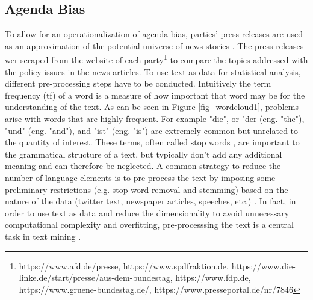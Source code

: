 \documentclass[12pt,a4paper,notitlepage]{article}
\begin{document}
 

\subsection{Agenda Bias}\label{ch_agendabias}

To allow for an operationalization of agenda bias, parties' press releases are used as an approximation of the potential universe of news stories \citep{eberl_one_2017}. The press releases wer scraped from the website of each party\footnote{https://www.afd.de/presse, https://www.spdfraktion.de, https://www.die-linke.de/start/presse/aus-dem-bundestag, https://www.fdp.de, https://www.gruene-bundestag.de/, https://www.presseportal.de/nr/7846} to compare the topics addressed with the policy issues in the news articles. To use text as data for statistical analysis, different pre-processing steps have to be conducted. Intuitively the term frequency (tf) of a word is a measure of how important that word may be for the understanding of the text. As can be seen in Figure \ref{fig_wordcloud1}, problems arise with words that are highly frequent. For example "die", or "der (eng. "the"), "und" (eng. "and"), and "ist" (eng. "is") are extremely common but unrelated to the quantity of interest. These terms, often called stop words \citep{gentzkow_text_2017}, are important to the grammatical structure of a text, but typically don't add any additional meaning and can therefore be neglected. A common strategy to reduce the number of language elements is to pre-process the text by imposing some preliminary restrictions (e.g. stop-word removal and stemming) based on the nature of the data (twitter text, newspaper articles, speeches, etc.) \citep{gentzkow_text_2017}. In fact, in order to use text as data and reduce the dimensionality to avoid unnecessary computational complexity and overfitting, pre-processsing the text is a central task in text mining \citep{bholat_text_2015}.  
\end{document}
